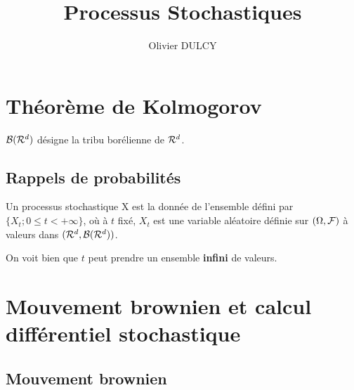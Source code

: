 

\title{Processus Stochastiques}
\author{Olivier DULCY}
\date{}



\pagestyle{theme}

\newcommand{\HRule}{\rule{\linewidth}{0.5mm}}
\newcommand\tikzmark[2][]{
  \tikz[remember picture,inner sep=\tabcolsep,outer sep=0,baseline=(#1.base),align=left]{\node[minimum width=\hsize](#1){$#2$};}
}


\maketitle

\frontmatter

\mainmatter

\chapter{Théorème de Kolmogorov}

$\mathcal{B}(\mathcal{R}^d)$ désigne la tribu borélienne de $\mathcal{R}^d$. \\

\section{Rappels de probabilités}

\begin{definition}
  Un processus stochastique X est la donnée de l'ensemble défini par $\{X_t; 0\leq t < +\infty\}$, où à $t$ fixé, $X_t$ est une variable aléatoire définie sur $(\Omega,\mathcal{F})$ à valeurs dans $(\mathcal{R}^d,\mathcal{B}(\mathcal{R}^d))$.
\end{definition}

\Rq On voit bien que $t$ peut prendre un ensemble \textbf{infini} de valeurs.
\chapter{Mouvement brownien et calcul différentiel stochastique}
\section{Mouvement brownien}

